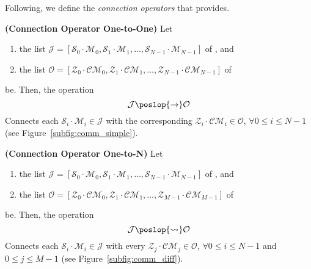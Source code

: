 
Following, we define the \textit{connection operators} that \posl{} provides.

\begin{definition}\label{op_conn:1to1}
{\bf (Connection Operator One-to-One)} Let 
\begin{enumerate}
\item the list $\mathcal{J} = \left[\mathcal{S}_0\cdot \mathcal{M}_0, \mathcal{S}_1\cdot \mathcal{M}_1,\dots, \mathcal{S}_{N-1}\cdot \mathcal{M}_{N-1}\right]$ of \jacks, and
\item the list $\mathcal{O} = \left[\mathcal{Z}_0\cdot \mathcal{CM}_0, \mathcal{Z}_1\cdot \mathcal{CM}_1,\dots, \mathcal{Z}_{N-1}\cdot \mathcal{CM}_{N-1}\right]$ of \outlets{}
\end{enumerate} be. Then, the operation 
\[
\mathcal{J} \poslop{\rightarrow} \mathcal{O}
\]
Connects each \jack{} $\mathcal{S}_i\cdot \mathcal{M}_i \in \mathcal{J}$ with the corresponding \outlet{} $\mathcal{Z}_i\cdot \mathcal{CM}_i \in \mathcal{O}$, $\forall 0 \leq i \leq N-1$ (see Figure~\ref{subfig:comm_simple}).
\end{definition}

\begin{definition}\label{op_conn:1ton}
{\bf (Connection Operator One-to-N)} Let 
\begin{enumerate} 
\item the list $\mathcal{J} = \left[\mathcal{S}_0\cdot \mathcal{M}_0, \mathcal{S}_1\cdot \mathcal{M}_1,\dots, \mathcal{S}_{N-1}\cdot \mathcal{M}_{N-1}\right]$ of \jacks, and 
\item the list $\mathcal{O} = \left[\mathcal{Z}_0\cdot \mathcal{CM}_0, \mathcal{Z}_1\cdot \mathcal{CM}_1,\dots, \mathcal{Z}_{M-1}\cdot \mathcal{CM}_{M-1}\right]$ of \outlets{} 
\end{enumerate} be. Then, the operation 
\[
\mathcal{J} \poslop{\rightsquigarrow} \mathcal{O}
\]
Connects each \jack{} $\mathcal{S}_i\cdot \mathcal{M}_i \in \mathcal{J}$ with every \outlet{} $\mathcal{Z}_j\cdot \mathcal{CM}_j \in \mathcal{O}$, $\forall 0 \leq i \leq N-1$ and $0 \leq j \leq M-1$ (see Figure~\ref{subfig:comm_diff}).
\end{definition}

